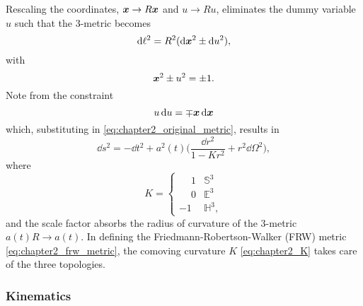 \noindent
Rescaling the coordinates, \(\vb*{x} \rightarrow R\vb*{x}\) and \(u \rightarrow Ru\), eliminates the dummy variable \(u\) such that the 3-metric becomes
%
\begin{equation}
	\dd{\ell^{2}}
	= R^{2} (\dd{\vb*{x}^{2}} \pm \dd{u^{2}}),
\end{equation}
%
with
%
\begin{equation}
	\vb*{x}^{2} \pm u^{2}
	= \pm 1.
\end{equation}
%
Note from the constraint
%
\begin{equation}
	u\dd{u}
	= \mp \vb*{x}\dd{\vb*{x}}
\end{equation}
%
which, substituting in \cref{eq:chapter2_original_metric}, results in
%
\begin{equation}\label{eq:chapter2_frw_metric}
	\dd{s^{2}}
	= -\dd{t^{2}} + a^{2}(t) \bigg( \frac{\dd{r^{2}}}{1-Kr^{2}} + r^{2}\dd{\Omega^{2}} \bigg),
\end{equation}
%
where
%
\begin{equation}\label{eq:chapter2_K}
	K =
	\begin{cases}
		\mathbin{\phantom{-}}1 & \mathbb{S}^{3}  \\
		\mathbin{\phantom{-}}0 & \mathbb{E}^{3}  \\
		-1                     & \mathbb{H}^{3},
	\end{cases}
\end{equation}
%
and the scale factor absorbs the radius of curvature of the 3-metric \(a(t)R \rightarrow a(t)\).
In defining the Friedmann-Robertson-Walker (FRW) metric \cref{eq:chapter2_frw_metric}, the comoving curvature \(K\) \cref{eq:chapter2_K} takes care of the three topologies.

\subsubsection{Kinematics}

